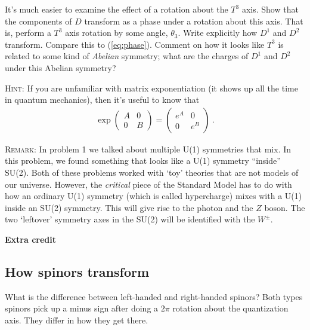 \documentclass[12pt]{article}
\begin{document}
It's much easier to examine the effect of a rotation about the $T^3$ axis. Show that the components of $D$ transform as a phase under a rotation about this axis. That is, perform a $T^3$ axis rotation by some angle, $\theta_3$. Write explicitly how $D^1$ and $D^2$ transform. Compare this to (\ref{eq:phase}). Comment on how it looks like $T^3$ is related to some kind of \emph{Abelian} symmetry; what are the charges of $D^1$ and $D^2$ under this Abelian symmetry?

\textsc{Hint}: If you are unfamiliar with matrix exponentiation (it shows up all the time in quantum mechanics), then it's useful to know that
\begin{align}
	\exp\begin{pmatrix}
		A & 0 \\
		0 & B
	\end{pmatrix}
	=
	\begin{pmatrix}
		e^A & 0  \\
		0 & e^B
	\end{pmatrix} \ .
\end{align}

\textsc{Remark}: In problem 1 we talked about multiple U(1) symmetries that mix. In this problem, we found something that looks like a U(1) symmetry ``inside'' SU(2). Both of these problems worked with `toy' theories that are not models of our universe. However, the \emph{critical} piece of the Standard Model has to do with how an ordinary U(1) symmetry (which is called hypercharge) mixes with a U(1) inside an SU(2) symmetry. This will give rise to the photon and the $Z$ boson. The two `leftover' symmetry axes in the SU(2) will be identified with the $W^\pm$. 



\vspace{1em}
\appendix
{\Large\textbf{Extra credit}}

\subsection{How spinors transform}

What is the difference between left-handed and right-handed spinors? Both types spinors pick up a minus sign after doing a $2\pi$ rotation about the quantization axis. They differ in how they get there. 
\end{document}

